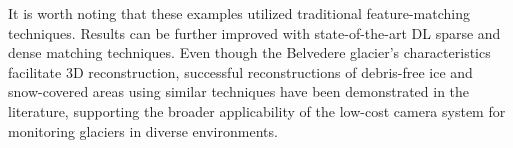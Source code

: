 It is worth noting that these examples utilized traditional feature-matching techniques.
Results can be further improved with state-of-the-art DL sparse and dense matching techniques.
Even though the Belvedere glacier's characteristics facilitate 3D reconstruction, successful reconstructions of debris-free ice and snow-covered areas using similar techniques have been demonstrated in the literature, supporting the broader applicability of the low-cost camera system for monitoring glaciers in diverse environments.

\makechapterbibliography{}
